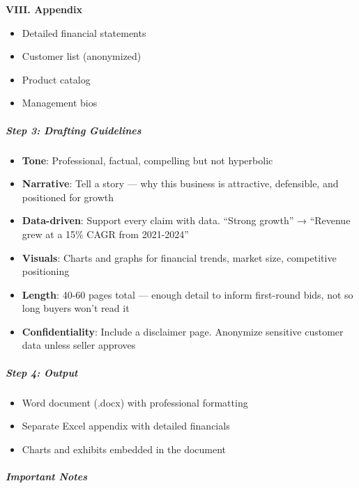 \documentclass[11pt]{article}
\begin{document}
\textbf{VIII. Appendix}

\begin{itemize}[leftmargin=*,itemsep=2pt,topsep=2pt]
\item {} Detailed financial statements
\item {} Customer list (anonymized)
\item {} Product catalog
\item {} Management bios
\end{itemize}

\subparagraph{Step 3: Drafting Guidelines}\mbox{}\par

\begin{itemize}[leftmargin=*,itemsep=2pt,topsep=2pt]
\item {} \textbf{Tone}: Professional, factual, compelling but not hyperbolic
\item {} \textbf{Narrative}: Tell a story — why this business is attractive, defensible, and positioned for growth
\item {} \textbf{Data-driven}: Support every claim with data. ``Strong growth'' → ``Revenue grew at a 15\% CAGR from 2021-2024''
\item {} \textbf{Visuals}: Charts and graphs for financial trends, market size, competitive positioning
\item {} \textbf{Length}: 40-60 pages total — enough detail to inform first-round bids, not so long buyers won't read it
\item {} \textbf{Confidentiality}: Include a disclaimer page. Anonymize sensitive customer data unless seller approves
\end{itemize}

\subparagraph{Step 4: Output}\mbox{}\par

\begin{itemize}[leftmargin=*,itemsep=2pt,topsep=2pt]
\item {} Word document (.docx) with professional formatting
\item {} Separate Excel appendix with detailed financials
\item {} Charts and exhibits embedded in the document
\end{itemize}

\subparagraph{Important Notes}\mbox{}\par
\end{document}
